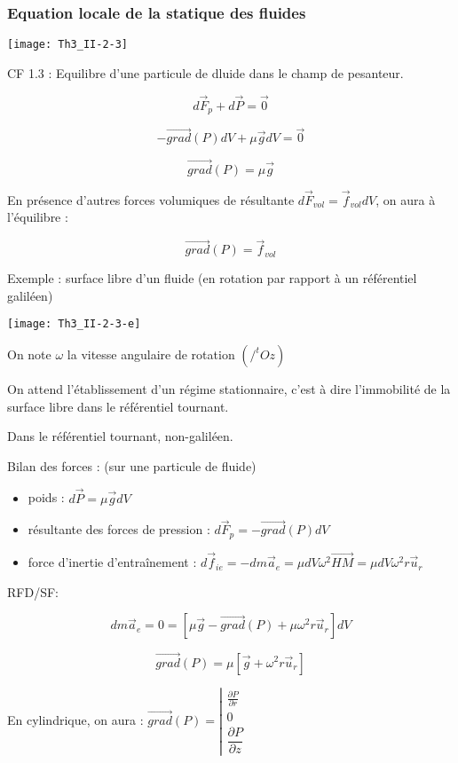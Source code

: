 \documentclass[a4paper,12pt]{book}
\newcommand{\grad}{\overrightarrow{grad}}
\begin{document}
\subsubsection{Equation locale de la statique des fluides}
\texttt{[image: Th3\_II-2-3]}
\par CF 1.3 : Equilibre d'une particule de dluide dans le champ de pesanteur.
\par $$ d\vec{F}_p +d\vec{P}=\vec{0}$$
\par $$-\overrightarrow{grad}(P)dV + \mu \vec{g}dV=\vec{0}$$
\par $$\overrightarrow{grad}(P) = \mu \vec{g}$$
\par En présence d'autres forces volumiques de résultante $d\vec{F}_{vol} = \vec{f}_{vol}dV$, on aura à l'équilibre :
\par $$ \overrightarrow{grad}(P) = \vec{f}_{vol}$$
\par Exemple : surface libre d'un fluide (en rotation par rapport à un référentiel galiléen)
\par \texttt{[image: Th3\_II-2-3-e]}
\par
\par On note $\omega$ la vitesse angulaire de rotation $(/^tOz)$
\par On attend l'établissement d'un régime stationnaire, c'est à dire l'immobilité de la surface libre dans le référentiel tournant.
\par Dans le référentiel tournant, non-galiléen.
\par Bilan des forces : (sur une particule de fluide)\begin{itemize}
\item poids : $d\vec{P} = \mu\vec{g}dV$
\item résultante des forces de pression : $d\vec{F}_p = -\overrightarrow{grad}(P)dV$
\item force d'inertie d'entraînement : $d\vec{f}_{ie} = -dm\vec{a}_e = \mu dV\omega^2\vec{HM} = \mu dV\omega^2 r\vec{u}_r$
\end{itemize}
RFD/SF:
\par $$ dm\vec{a}_e = 0 = \left[\mu\vec{g}-\grad(P)+\mu\omega^2r\vec{u}_r\right]dV$$
\par $$\grad(P) = \mu \left[\vec{g}+\omega^2r\vec{u}_r\right]$$
\par En cylindrique, on aura : $\grad(P) = \left\vert\begin{array}{c} \frac{\partial P}{\partial r} \\ 0 \\ \dfrac{\partial P}{\partial z}\end{array}\right.$
\end{document}
